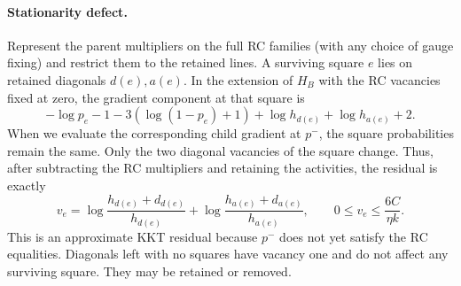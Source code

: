 \paragraph{Stationarity defect.}
Represent the parent multipliers on the full RC families (with any choice of gauge fixing) and restrict them
to the retained lines. A surviving square $e$ lies on retained diagonals $d(e),a(e)$. In the extension of
$H_B$ with the RC vacancies fixed at zero, the gradient component at that square is
\[
 -\log p_e-1-3(\log(1-p_e)+1)
 +\log h_{d(e)}+\log h_{a(e)}+2.
\]
When we evaluate the corresponding child gradient at $p^-$, the square probabilities remain the same. Only
the two diagonal vacancies of the square change. Thus, after subtracting the RC multipliers and retaining
the activities, the residual is exactly
\[
 v_e=\log\frac{h_{d(e)}+d_{d(e)}}{h_{d(e)}}
     +\log\frac{h_{a(e)}+d_{a(e)}}{h_{a(e)}},
 \qquad 0\le v_e\le\frac{6C}{\eta k}.
\]
This is an approximate KKT residual because $p^-$ does not yet satisfy the RC equalities.
Diagonals left with no squares have vacancy one and do not affect any surviving square. They may be retained
or removed.
